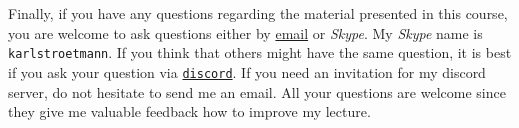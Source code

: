 Finally, if you have any questions regarding the material presented in this course, you are
welcome to ask questions either by \href{mailto:karl.stroetmann@dhbw-mannheim.de}{email} or 
\textsl{Skype}.  My \textsl{Skype} name is \texttt{karlstroetmann}.  If you think that others might
have the same question, it is best if you ask your question via
\href{https://discordapp.com}{\texttt{discord}}.  If you need an invitation for my discord server,
do not hesitate to send me an email.  
All your questions are welcome since they give me valuable feedback how to improve my lecture. 


